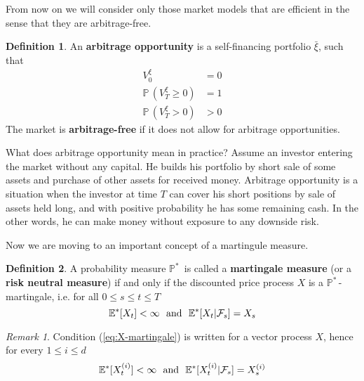 \documentclass[a4paper,11pt, twoside]{book}
\theoremstyle{definition}
\newtheorem{mydef}{Definition}[chapter]
\theoremstyle{remark}
\newtheorem{remark}{Remark}[chapter]
\def\P{{\mathbb{P}}\,}
\def\Em{{\mathbb{E}^*}}
\def\Pm{{\mathbb{P}}^*\,}
\def\xia{\bar{\xi}}
\begin{document}
From now on we will consider only those market models that are efficient in the sense that they are arbitrage-free.
\begin{mydef}
 An \textbf{arbitrage opportunity} is a self-financing portfolio $\xia$, such that
 \begin{align*}
  V^{\xi}_0 &= 0\\
  \P(V^{\xi}_T \geq 0) &= 1\\
  \P(V^{\xi}_T > 0 ) &> 0
 \end{align*}
 The market is \textbf{arbitrage-free} if it does not allow for arbitrage opportunities.
\end{mydef}
What does arbitrage opportunity mean in practice? Assume an investor entering the market without any capital. He builds his portfolio by short sale of some assets and purchase of other assets for received money. Arbitrage opportunity is a situation when the investor at time $T$ can cover his short positions by sale of assets held long, and with positive probability he has some remaining cash.
In the other words, he can make money without exposure to any downside risk. 

Now we are moving to an important concept of a martingule measure.
\begin{mydef}
 A probability measure $\Pm$ is called a \textbf{martingale measure} (or a \textbf{risk neutral measure}) if and only if the discounted price process $X$ is a $\Pm$-martingale, i.e. for all  $0 \leq s \leq t \leq T$
 \begin{equation}
  \label{eq:X-martingale}
  \Em[X_t] < \infty \hbox{\ \ and\ \ } \Em[X_t | \mathcal{F}_s] = X_s
 \end{equation}
\end{mydef}

\begin{remark}
 Condition (\ref{eq:X-martingale}) is written for a vector process $X$, hence for every $1 \leq i \leq d$
  \begin{equation*}
  \Em[X^{(i)}_t] < \infty \hbox{\ \ and\ \ } \Em[X^{(i)}_t | \mathcal{F}_s] = X^{(i)}_s
 \end{equation*}
\end{remark}
\end{document}
